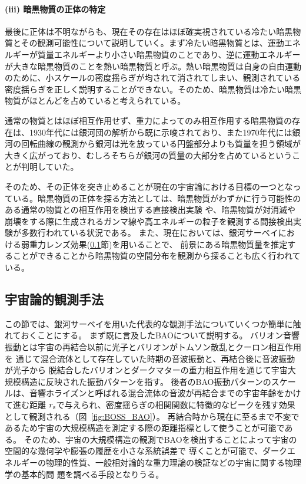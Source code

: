 \paragraph{(iii) 暗黒物質の正体の特定}
最後に正体は不明ながらも、現在その存在はほぼ確実視されている冷たい暗黒物質とその観測可能性について説明していく。まず冷たい暗黒物質とは、運動エネルギーが質量エネルギーより小さい暗黒物質のことであり、逆に運動エネルギーが大きな暗黒物質のことを熱い暗黒物質と呼ぶ。熱い暗黒物質は自身の自由運動のために、小スケールの密度揺らぎが均されて消されてしまい、観測されている密度揺らぎを正しく説明することができない。そのため、暗黒物質は冷たい暗黒物質がほとんどを占めていると考えられている。

通常の物質とはほぼ相互作用せず、重力によってのみ相互作用する暗黒物質の存在は、1930年代には銀河団の解析から既に示唆されており、また1970年代には銀河の回転曲線の観測から銀河は光を放っている円盤部分よりも質量を担う領域が大きく広がっており、むしろそちらが銀河の質量の大部分を占めているということが判明していた。

そのため、その正体を突き止めることが現在の宇宙論における目標の一つとなっている。暗黒物質の正体を探る方法としては、暗黒物質がわずかに行う可能性のある通常の物質との相互作用を検出する直接検出実験
や、暗黒物質が対消滅や崩壊をする際に生成されるガンマ線や高エネルギーの粒子を観測する間接検出実験が多数行われている状況である。
また、現在においては、銀河サーベイにおける弱重力レンズ効果(\ref{cosmology.s1.ss1-2}節)を用いることで、
前景にある暗黒物質量を推定することができることから暗黒物質の空間分布を観測から探ることも広く行われている。

\subsection{宇宙論的観測手法}\label{cosmology.s1.ss1-2}

この節では、銀河サーベイを用いた代表的な観測手法についていくつか簡単に触れておくことにする。
まず既に言及したBAOについて説明する。
バリオン音響振動とは宇宙の再結合以前に光子とバリオンがトムソン散乱とクーロン相互作用を
通じて混合流体として存在していた時期の音波振動と、再結合後に音波振動が光子から
脱結合したバリオンとダークマターの重力相互作用を通じて宇宙大規模構造に反映された振動パターンを指す。
後者のBAO振動パターンのスケールは、音響ホライズンと呼ばれる混合流体の音波が再結合までの宇宙年齢をかけて進む距離
$r_{\rm s}$で与えられ、密度揺らぎの相関関数に特徴的なピークを残す効果として観測される（図~\ref{fig:BOSS_BAO}）。
再結合時から現在に至るまで不変であるため宇宙の大規模構造を測定する際の距離指標として使うことが可能である。
そのため、宇宙の大規模構造の観測でBAOを検出することによって宇宙の空間的な幾何学や膨張の履歴を小さな系統誤差で
導くことが可能で、ダークエネルギーの物理的性質、一般相対論的な重力理論の検証などの宇宙に関する物理学の基本的問
題を調べる手段となりうる。


